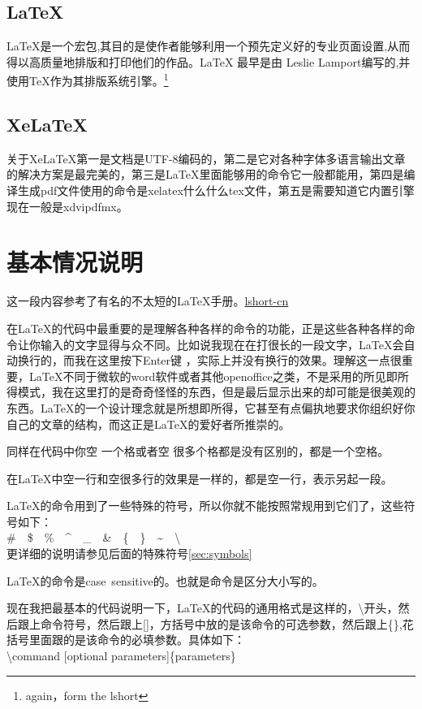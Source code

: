 \documentclass[12pt,oneside]{book}
\begin{document}
\begin{common-format}
\subsection{LaTeX}
LaTeX是一个宏包,其目的是使作者能够利用一个预先定义好的专业页面设置,从而得以高质量地排版和打印他们的作品。LaTeX 最早是由 Leslie Lamport编写的,并使用\TeX 作为其排版系统引擎。\footnote{again，form the lshort}

\subsection{XeLaTeX}
关于XeLaTeX第一是文档是UTF-8编码的，第二是它对各种字体多语言输出文章的解决方案是最完美的，第三是LaTeX里面能够用的命令它一般都能用，第四是编译生成pdf文件使用的命令是xelatex什么什么tex文件，第五是需要知道它内置引擎现在一般是xdvipdfmx。


\section{基本情况说明}
这一段内容参考了有名的不太短的LaTeX手册。\href{http://www.ctan.org/pkg/lshort-zh-cn}{lshort-cn}

在\LaTeX 的代码中最重要的是理解各种各样的命令的功能，正是这些各种各样的命令让你输入的文字显得与众不同。比如说我现在在打很长的一段文字，\LaTeX 会自动换行的，而我在这里按下Enter键
，实际上并没有换行的效果。理解这一点很重要，\LaTeX 不同于微软的word软件或者其他openoffice之类，不是采用的所见即所得模式，我在这里打的是奇奇怪怪的东西，但是最后显示出来的却可能是很美观的东西。\LaTeX 的一个设计理念就是所想即所得，它甚至有点偏执地要求你组织好你自己的文章的结构，而这正是\LaTeX 的爱好者所推崇的。

同样在代码中你空 一个格或者空      很多个格都是没有区别的，都是一个空格。

在\LaTeX 中空一行和空很多行的效果是一样的，都是空一行，表示另起一段。

\LaTeX 的命令用到了一些特殊的符号，所以你就不能按照常规用到它们了，这些符号如下：\\
\#~~\$~~\%~~\^~~\_~~\&~~\{~~\}~~\~~~\textbackslash \\
更详细的说明请参见后面的特殊符号\ref{sec:symbols}

\LaTeX 的命令是case~sensitive的。也就是命令是区分大小写的。

现在我把最基本的代码说明一下，\LaTeX 的代码的通用格式是这样的，\textbackslash 开头，然后跟上命令符号，然后跟上[]，方括号中放的是该命令的可选参数，然后跟上\{\},花括号里面跟的是该命令的必填参数。具体如下：\\
\textbackslash command [optional parameters]\{parameters\}


\end{common-format}
\end{document}
